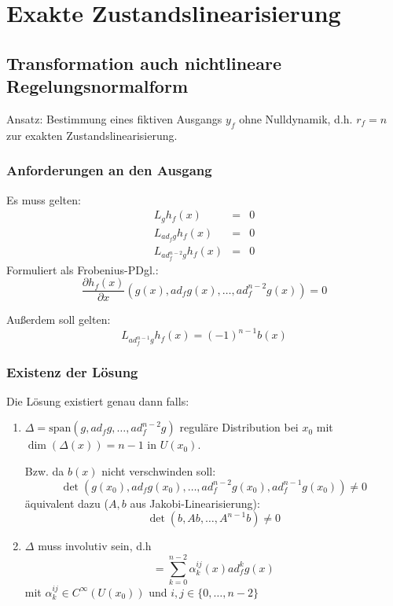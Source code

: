 \chapter{Exakte Zustandslinearisierung}
\section{Transformation auch nichtlineare Regelungsnormalform}
Ansatz: Bestimmung eines fiktiven Ausgangs $y_f$ ohne Nulldynamik, d.h. $r_f = n$ zur
exakten Zustandslinearisierung.

\subsection{Anforderungen an den Ausgang}
Es muss gelten:
\begin{eqnarray}
    L_g h_f(x) &=& 0 \\
    L_{ad_f g} h_f(x) &=& 0 \\
    L_{ad_f^{n-2} g} h_f(x) &=& 0
\end{eqnarray}
Formuliert als Frobenius-PDgl.:
\begin{equation}
    \frac{\partial h_f(x)}{\partial x} \left(g(x), ad_f g(x), \ldots, ad_f^{n-2} g(x)\right) = 0
\end{equation}

Außerdem soll gelten:
\begin{equation}
    L_{ad_f^{n-1} g} h_f(x) = {(-1)}^{n-1} b(x)
\end{equation}

\subsection{Existenz der Lösung}
Die Lösung existiert genau dann falls:
\begin{enumerate}
    \item 
        $\Delta = \text{span}(g, ad_f g, \ldots, ad_f^{n-2} g)$ reguläre Distribution
        bei $x_0$ mit $\dim(\Delta(x)) = n-1$ in $U(x_0)$.

        Bzw. da $b(x)$ nicht verschwinden soll:
        \begin{equation}
            \det(g(x_0), ad_f g(x_0), \ldots, ad_f^{n-2} g(x_0), ad_f^{n-1} g(x_0)) \neq 0
        \end{equation}
        äquivalent dazu ($A, b$ aus Jakobi-Linearisierung):
        \begin{equation}
            \det(b, Ab, \ldots, A^{n-1} b) \neq 0
        \end{equation}
    \item
        $\Delta$ muss involutiv sein, d.h 
        \begin{equation}
            [ad_f^i g(x), ad_f^j g(x)]
                = \sum_{k=0}^{n-2} \alpha_k^{ij} (x) ad_f^k g(x)
        \end{equation}
        mit $\alpha_k^{ij} \in C^\infty (U(x_0))$ und $i, j \in \{0, \ldots, n-2\}$
\end{enumerate}

